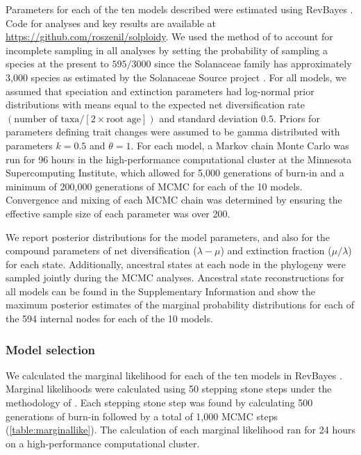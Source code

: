 Parameters for each of the ten models described were estimated using RevBayes \citep{hoehna_2016}.
Code for analyses and key results are available at \url{https://github.com/roszenil/solploidy}.
We used the method of \citet{fitzjohn_2009} to account for incomplete sampling in all analyses by setting the probability of sampling a species at the present to $595/3000$ since the Solanaceae family has approximately 3,000 species as estimated by the Solanaceae Source project \citep{solsource}.
For all models, we assumed that speciation and extinction parameters had log-normal prior distributions with means equal to the expected net diversification rate $(\text{number of taxa} / [2 \times \text{root age}])$ and standard deviation $0.5$.
Priors for parameters defining trait changes were assumed to be gamma distributed with parameters $k=0.5$ and $\theta=1$. 
For each model, a Markov chain Monte Carlo \citep[MCMC;][]{metropolis1953equation,Hastings1970} was run for 96 hours in the high-performance computational cluster at the Minnesota Supercomputing Institute, which allowed for 5,000 generations of burn-in and a minimum of 200,000 generations of MCMC for each of the 10 models. %
Convergence and mixing of each MCMC chain was determined by ensuring the effective sample size of each parameter was over 200.

We report posterior distributions for the model parameters, and also for the compound parameters of net diversification ($\lambda - \mu$) and extinction fraction ($\mu / \lambda$) for each state.
Additionally, ancestral states at each node in the phylogeny were sampled jointly during the MCMC analyses.
Ancestral state reconstructions for all models can be found in the Supplementary Information and show the maximum posterior estimates of the marginal probability distributions for each of the 594 internal nodes for each of the 10 models. %

\subsubsection{Model selection}

We calculated the marginal likelihood for each of the ten models in RevBayes \citep{hoehna_2016}.
Marginal likelihoods were calculated using 50 stepping stone steps under the methodology of \citet{xie_2010}.
Each stepping stone step was found by calculating 500 generations of burn-in followed by a total of 1,000 MCMC steps (\cref{table:marginallike}).
The calculation of each marginal likelihood ran for 24 hours on a high-performance computational cluster.

